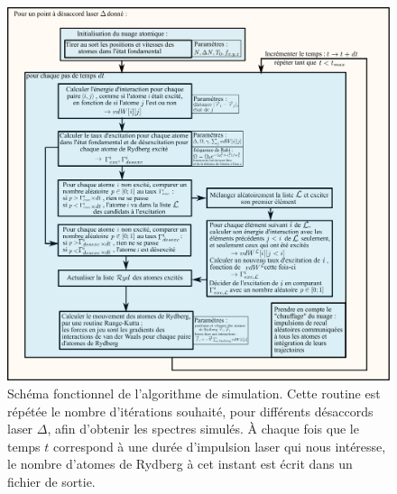 \documentclass[11pt,a4paper,twoside]{book}
\begin{document}
\begin{figure}[h]
\hspace{-.18\linewidth}
\includegraphics[width=1.3\linewidth]{figures/apx/simus_interactions}
\caption[Schéma fonctionnel de l'algorithme de simulation]
{
Schéma fonctionnel de l'algorithme de simulation.
Cette routine est répétée le nombre d'itérations souhaité, pour différents désaccords laser $\Delta$, afin d'obtenir les spectres simulés.
À chaque fois que le temps $t$ correspond à une durée d'impulsion laser qui nous intéresse, le nombre d'atomes de Rydberg à cet instant est écrit dans un fichier de sortie.
}
\label{fig:algo_sim_spectresoptiques}
\end{figure}
\clearpage

\newpage $ $

\renewcommand{\bibname}{Bibliographie}
\printbibliography

\backmatter
\end{document}

